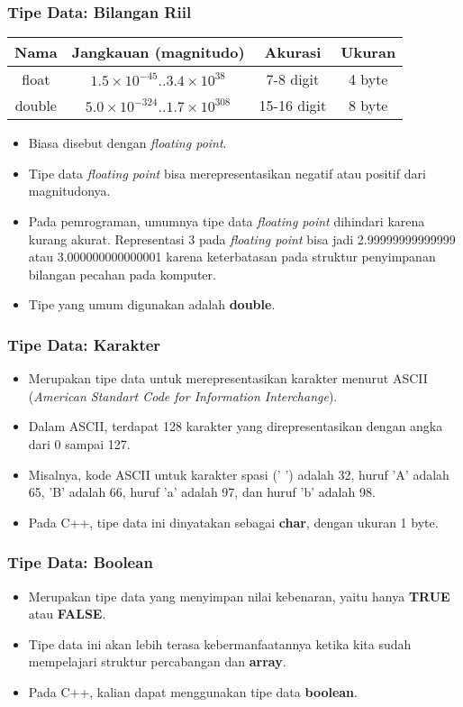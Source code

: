 \begin{frame}
\frametitle{Tipe Data: Bilangan Riil}
\begin{table}[ht]
  \begin{tabular}{|c|c|c|c|}
    \hline Nama  & Jangkauan (magnitudo) & Akurasi & Ukuran \\
    \hline float & $1.5\times10^{-45} .. 3.4\times10^{38}$ & 7-8 digit & 4 byte\\
    \hline double & $5.0\times10^{-324} .. 1.7\times10^{308}$ & 15-16 digit & 8 byte \\
    \hline
  \end{tabular}
\end{table}
\begin{itemize}
  \item Biasa disebut dengan \textit{floating point}.
  \item Tipe data \textit{floating point} bisa merepresentasikan negatif atau positif dari magnitudonya.
  \item Pada pemrograman, umumnya tipe data \textit{floating point} dihindari karena kurang akurat. Representasi 3 pada \textit{floating point} bisa jadi 2.99999999999999 atau 3.000000000000001 karena keterbatasan pada struktur penyimpanan bilangan pecahan pada komputer.
  \item Tipe yang umum digunakan adalah \alert{\textbf{double}}.
\end{itemize}
\end{frame}

\begin{frame}
\frametitle{Tipe Data: Karakter}
\begin{itemize}
  \item Merupakan tipe data untuk merepresentasikan karakter menurut ASCII (\textit{American Standart Code for Information Interchange}).
  \item Dalam ASCII, terdapat 128 karakter yang direpresentasikan dengan angka dari 0 sampai 127.
  \item Misalnya, kode ASCII untuk karakter spasi (' ') adalah 32, huruf 'A' adalah 65, 'B' adalah 66, huruf 'a' adalah 97, dan huruf 'b' adalah 98.
  \item Pada C++, tipe data ini dinyatakan sebagai \alert{\textbf{char}}, dengan ukuran 1 byte.
\end{itemize}
\end{frame}

\begin{frame}
\frametitle{Tipe Data: Boolean}
\begin{itemize}
  \item Merupakan tipe data yang menyimpan nilai kebenaran, yaitu hanya \textbf{TRUE} atau \textbf{FALSE}.
  \item Tipe data ini akan lebih terasa kebermanfaatannya ketika kita sudah mempelajari struktur percabangan dan \textbf{array}.
  \item Pada C++, kalian dapat menggunakan tipe data \alert{\textbf{boolean}}.
\end{itemize}
\end{frame}


